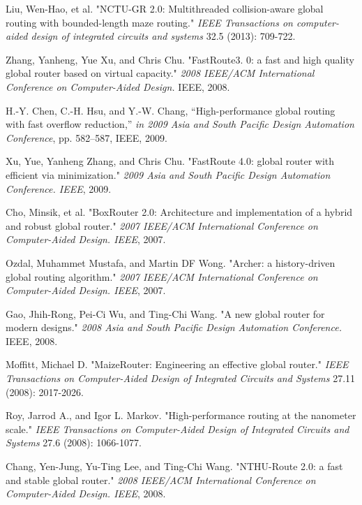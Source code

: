 \documentclass[conference]{IEEEtran}
\begin{document}
\begin{thebibliography}{00}

     Liu, Wen-Hao, et al. "NCTU-GR 2.0: Multithreaded collision-aware global routing with bounded-length maze routing." \textit{IEEE Transactions on computer-aided design of integrated circuits and systems} 32.5 (2013): 709-722.
    
     Zhang, Yanheng, Yue Xu, and Chris Chu. "FastRoute3. 0: a fast and high quality global router based on virtual capacity." \textit{2008 IEEE/ACM International Conference on Computer-Aided Design.} IEEE, 2008.

     H.-Y. Chen, C.-H. Hsu, and Y.-W. Chang, “High-performance global routing with fast overflow reduction,” \textit{in 2009 Asia and South Pacific Design Automation Conference}, pp. 582–587, IEEE, 2009.

     Xu, Yue, Yanheng Zhang, and Chris Chu. "FastRoute 4.0: global router with efficient via minimization." \textit{2009 Asia and South Pacific Design Automation Conference. IEEE}, 2009.

     Cho, Minsik, et al. "BoxRouter 2.0: Architecture and implementation of a hybrid and robust global router." \textit{2007 IEEE/ACM International Conference on Computer-Aided Design. IEEE}, 2007.

     Ozdal, Muhammet Mustafa, and Martin DF Wong. "Archer: a history-driven global routing algorithm." \textit{2007 IEEE/ACM International Conference on Computer-Aided Design. IEEE}, 2007.

     Gao, Jhih-Rong, Pei-Ci Wu, and Ting-Chi Wang. "A new global router for modern designs." \textit{2008 Asia and South Pacific Design Automation Conference.} IEEE, 2008.

     Moffitt, Michael D. "MaizeRouter: Engineering an effective global router." \textit{IEEE Transactions on Computer-Aided Design of Integrated Circuits and Systems} 27.11 (2008): 2017-2026.

     Roy, Jarrod A., and Igor L. Markov. "High-performance routing at the nanometer scale." \textit{IEEE Transactions on Computer-Aided Design of Integrated Circuits and Systems} 27.6 (2008): 1066-1077.

     Chang, Yen-Jung, Yu-Ting Lee, and Ting-Chi Wang. "NTHU-Route 2.0: a fast and stable global router." \textit{2008 IEEE/ACM International Conference on Computer-Aided Design. IEEE}, 2008.


\end{thebibliography}
\end{document}
